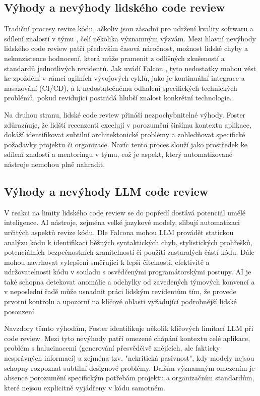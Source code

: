 \documentclass[12pt, a4paper]{article}
\begin{document}
\subsection{Výhody a nevýhody lidského code review}
Tradiční procesy revize kódu, ačkoliv jsou zásadní pro udržení kvality softwaru a sdílení znalostí v týmu \cite{zdrojak2022}, čelí několika významným výzvám. Mezi hlavní nevýhody lidského code review patří především časová náročnost, možnost lidské chyby a nekonzistence hodnocení, která může pramenit z odlišných zkušeností a standardů jednotlivých revidentů. Jak uvádí Falcon \cite{falcon2024devto}, tyto nedostatky mohou vést ke zpoždění v rámci agilních vývojových cyklů, jako je kontinuální integrace a nasazování (CI/CD), a k nedostatečnému odhalení specifických technických problémů, pokud revidující postrádá hlubší znalost konkrétní technologie.

Na druhou stranu, lidské code review přináší nezpochybnitelné výhody. Foster \cite{graphite2023} zdůrazňuje, že lidští recenzenti excelují v porozumění širšímu kontextu aplikace, dokáží identifikovat subtilní architektonické problémy a zohledňovat specifické požadavky projektu či organizace. Navíc tento proces slouží jako prostředek ke sdílení znalostí a mentoringu v týmu, což je aspekt, který automatizované nástroje nemohou plně nahradit.

\subsection{Výhody a nevýhody LLM code review}
V reakci na limity lidského code review se do popředí dostává potenciál umělé inteligence. AI nástroje, zejména velké jazykové modely, slibují automatizaci určitých aspektů revize kódu. Dle Falcona \cite{falcon2024devto} mohou LLM provádět statickou analýzu kódu k identifikaci běžných syntaktických chyb, stylistických prohřešků, potenciálních bezpečnostních zranitelností či použití zastaralých částí kódu. Dále mohou navrhovat vylepšení směřující k lepší čitelnosti, efektivitě a udržovatelnosti kódu v souladu s osvědčenými programátorskými postupy. AI je také schopna detekovat anomálie a odchylky od zavedených týmových konvencí a v neposlední řadě může usnadnit práci lidským revidentům tím, že provede prvotní kontrolu a upozorní na klíčové oblasti vyžadující podrobnější lidské posouzení.

Navzdory těmto výhodám, Foster \cite{graphite2023} identifikuje několik klíčových limitací LLM při code review. Mezi tyto nevýhody patří omezené chápání kontextu celé aplikace, problém s halucinacemi (generování přesvědčivě znějících, ale fakticky nesprávných informací) a zejména tzv. "nekritická pasivnost", kdy modely nejsou schopny rozpoznat subtilní designové problémy. Dalším významným omezením je absence porozumění specifickým potřebám projektu a organizačním standardům, které nejsou explicitně vyjádřeny v kódu samotném.
\end{document}

